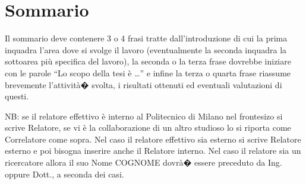 \newpage
\chapter*{Sommario}


Il sommario deve contenere 3 o 4 frasi tratte dall'introduzione di cui la prima inquadra l'area dove si svolge il lavoro (eventualmente la seconda inquadra la sottoarea pi\`u specifica del lavoro), la seconda o la terza frase dovrebbe iniziare con le parole ``Lo scopo della tesi \`e \dots'' e infine la terza o quarta frase riassume brevemente l'attivit\`a� svolta, i risultati ottenuti ed eventuali valutazioni di questi.

\vspace{0.5cm}
\noindent NB: se il relatore effettivo \`e interno al Politecnico di Milano nel frontesizo si scrive Relatore, se vi \`e la collaborazione di un altro studioso lo si riporta come Correlatore come sopra. Nel caso il relatore effettivo sia esterno si scrive Relatore esterno e poi bisogna inserire anche il Relatore interno. Nel caso il relatore sia un ricercatore allora il suo Nome COGNOME dovr\`a� essere preceduto da Ing. oppure Dott., a seconda dei casi.
